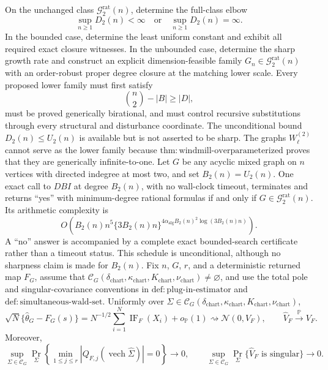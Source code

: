 On the unchanged class \(\mathcal G_{2}^{\mathrm{rat}}(n)\), determine the full-class elbow
\[
 \sup_{n\geq1}D_2(n)<\infty\quad\text{or}\quad \sup_{n\geq1}D_2(n)=\infty.
\]
In the bounded case, determine the least uniform constant and exhibit all required exact closure witnesses.  In the unbounded case, determine the sharp growth rate and construct an explicit dimension-feasible family \(G_n\in\mathcal G_{2}^{\mathrm{rat}}(n)\) with an order-robust proper degree closure at the matching lower scale.  Every proposed lower family must first satisfy
\[
 \binom n2-|B|\geq |D|,
\]
must be proved generically birational, and must control recursive substitutions through every structural and disturbance coordinate.  The unconditional bound \(D_2(n)\leq U_2(n)\) is available but is not asserted to be sharp.  The graphs \(W_{\ell}^{(2)}\) cannot serve as the lower family because \(\mathrm{thm:windmill\mbox{-}overparameterized}\) proves that they are generically infinite-to-one.
Let \(G\) be any acyclic mixed graph on \(n\) vertices with directed indegree at most two, and set \(B_2(n)=U_2(n)\).  One exact call to \(DBI\) at degree \(B_2(n)\), with no wall-clock timeout, terminates and returns ``yes'' with minimum-degree rational formulas if and only if \(G\in\mathcal G_{2}^{\mathrm{rat}}(n)\).  Its arithmetic complexity is
\[
 O\!\left(B_2(n)n^5\{3B_2(n)n\}^{4\alpha_{\mathrm{alg}}B_2(n)^2\log(3B_2(n)n)}\right).
\]
A ``no'' answer is accompanied by a complete exact bounded-search certificate rather than a timeout status.  This schedule is unconditional, although no sharpness claim is made for \(B_2(n)\).
Fix \(n\), \(G\), \(r\), and a deterministic returned map \(F_G\), assume that \(\mathcal C_G(\delta_{\mathrm{chart}},\kappa_{\mathrm{chart}},K_{\mathrm{chart}},\nu_{\mathrm{chart}})\neq\varnothing\), and use the total pole and singular-covariance conventions in \(\mathrm{def:plug\mbox{-}in\mbox{-}estimator}\) and \(\mathrm{def:simultaneous\mbox{-}wald\mbox{-}set}\). Uniformly over \(\Sigma\in\mathcal C_G(\delta_{\mathrm{chart}},\kappa_{\mathrm{chart}},K_{\mathrm{chart}},\nu_{\mathrm{chart}})\),
\[
\sqrt N\{\widehat\theta_G-F_G(s)\}=N^{-1/2}\sum_{i=1}^N\operatorname{IF}_F(X_i)+o_{\mathbb P}(1)\rightsquigarrow\mathcal N(0,V_F),\qquad \widehat V_F\xrightarrow{\mathbb P}V_F.
\]
Moreover,
\[
\sup_{\Sigma\in\mathcal C_G}\Pr_{\Sigma}\!\left\{\min_{1\le j\le r}|Q_{F,j}(\operatorname{vech}\widehat\Sigma)|=0\right\}\to0,\qquad \sup_{\Sigma\in\mathcal C_G}\Pr_{\Sigma}\{\widehat V_F\text{ is singular}\}\to0.
\]
